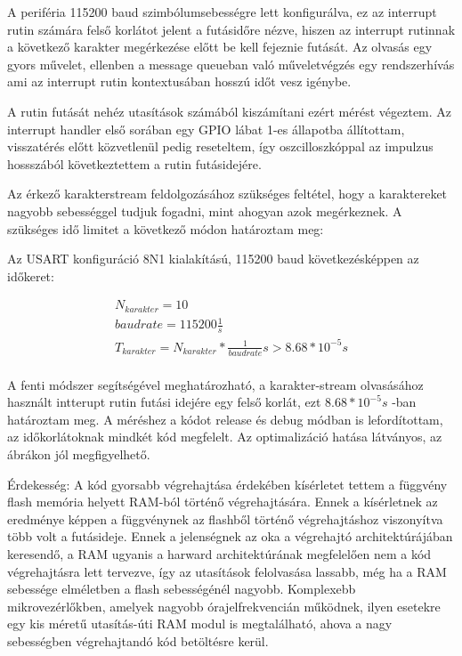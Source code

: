 A periféria 115200 baud szimbólumsebességre lett konfigurálva, ez az interrupt
rutin számára felső korlátot jelent a futásidőre nézve, hiszen az interrupt
rutinnak a következő karakter megérkezése előtt be kell fejeznie futását. Az
olvasás egy gyors művelet, ellenben a message queueban való műveletvégzés egy
rendszerhívás ami az interrupt rutin kontextusában hosszú időt vesz igénybe.

A rutin futását nehéz utasítások számából kiszámítani ezért mérést végeztem. Az
interrupt handler első sorában egy GPIO lábat 1-es állapotba állítottam,
visszatérés előtt közvetlenül pedig reseteltem, így oszcilloszkóppal az impulzus
hossszából következtettem a rutin futásidejére.



Az érkező karakterstream feldolgozásához szükséges feltétel, hogy a karaktereket
nagyobb sebességgel tudjuk fogadni, mint ahogyan azok megérkeznek. A szükséges
idő limitet a következő módon határoztam meg:

\medskip

Az USART konfiguráció 8N1 kialakítású, 115200 baud következésképpen az időkeret:

\begin{eqnarray*}
N_{karakter} = 10 \\
baudrate = 115200 \frac{1}{s} \\
T_{karakter} = N_{karakter} * \frac{1}{baudrate} s > 8.68 * 10^{-5} s \\
\end{eqnarray*}

A fenti módszer segítségével meghatározható, a karakter-stream olvasásához
használt intterupt rutin futási idejére egy felső korlát, ezt $8.68 * 10^{-5}s$
-ban határoztam meg. A méréshez a kódot release és debug módban is lefordítottam,
az időkorlátoknak mindkét kód megfelelt. Az optimalizáció hatása látványos, az
ábrákon jól megfigyelhető.

\medskip

Érdekesség: A kód gyorsabb végrehajtása érdekében kísérletet tettem a függvény
flash memória helyett RAM-ból történő végrehajtására. Ennek a kísérletnek az
eredménye képpen a függvénynek az flashből történő végrehajtáshoz viszonyítva
több volt a futásideje. Ennek a jelenségnek az oka a végrehajtó architektúrájában
keresendő, a RAM ugyanis a harward architektúrának megfelelően nem a
kód végrehajtásra lett tervezve, így az utasítások felolvasása lassabb, még ha a
RAM sebessége elméletben a flash sebességénél nagyobb. Komplexebb
mikrovezérlőkben, amelyek nagyobb órajelfrekvencián működnek, ilyen esetekre egy
kis méretű utasítás-úti RAM modul is megtalálható, ahova a nagy sebességben
végrehajtandó kód betöltésre kerül.

